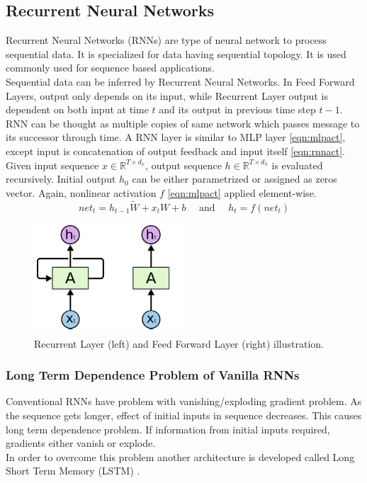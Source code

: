 \subsection{Recurrent Neural Networks}
Recurrent Neural Networks (RNNs) \cite{rumelhart_learning_1986} are type of neural network to process sequential data. It is specialized for data having sequential topology. It is used commonly used for sequence based applications. \\
Sequential data can be inferred by Recurrent Neural Networks. In Feed Forward Layers, output only depends on its input, while Recurrent Layer output is dependent on both input at time $t$ and its output in previous time step $t-1$. \\
RNN can be thought as multiple copies of same network which passes message to its successor through time. A RNN layer is similar to MLP layer \ref{eqn:mlpact}, except input is concatenation of output feedback and input itself \ref{eqn:rnnact}. \\
Given input sequence $x \in \mathbb{R}^{T \times d_x}$, output sequence $h \in \mathbb{R}^{T \times d_h}$ is evaluated recursively. Initial output $h_0$ can be either parametrized or assigned as zeros vector. Again, nonlinear activation $f$ \ref{eqn:mlpact} applied element-wise. \\
\begin{equation}
\label{eqn:rnnact}
net_t = h_{t-1} \tilde{W} + x_t W + b \quad \text{ and }\quad  h_t = f(net_t)
\end{equation}
\begin{figure}
	\centering
	\includegraphics[width=0.5\textwidth]{figures/ml_theory/rnn_vs_ffnn_layer.png}
	\caption{Recurrent Layer (left) and Feed Forward Layer (right) illustration.}
	\label{fig:rnn_vs_ffnn}
\end{figure}

\subsubsection{Long Term Dependence Problem of Vanilla RNNs}
Conventional RNNs have problem with vanishing/exploding gradient problem.  As the sequence gets longer, effect of initial inputs in sequence decreases. This causes long term dependence problem. If information from initial inputs required, gradients either vanish or explode. \\
In order to overcome this problem another architecture is developed called Long Short Term Memory (LSTM) \cite{hochreiter_long_1997}. \\

